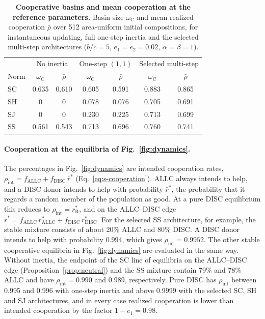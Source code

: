 \documentclass[10pt]{wlscirep}
\newcommand{\rR}{r_{\mathrm{R}}^{*}}
\newcommand{\ALLC}{\mathrm{ALLC}}
\newcommand{\DISC}{\mathrm{DISC}}
\theoremstyle{plain}
\theoremstyle{remark}
\begin{document}
\begin{table}[!htbp]
\centering
\caption{\textbf{Cooperative basins and mean cooperation at the reference parameters.} Basin size $\omega_{\mathrm C}$ and mean realized cooperation $\bar\rho$ over 512 area-uniform initial compositions, for instantaneous updating, full one-step inertia and the selected multi-step architectures ($b/c=5$, $e_1=e_2=0.02$, $\alpha=\beta=1$).}
\label{tab:si-basins}
\small
\begin{tabular}{@{}lcccccc@{}}
\toprule
 & \multicolumn{2}{c}{No inertia} & \multicolumn{2}{c}{One-step $(1,1)$} & \multicolumn{2}{c}{Selected multi-step}\\
Norm & $\omega_{\mathrm C}$ & $\bar\rho$ & $\omega_{\mathrm C}$ & $\bar\rho$ & $\omega_{\mathrm C}$ & $\bar\rho$\\
\midrule
SC & 0.635 & 0.610 & 0.605 & 0.591 & 0.883 & 0.865\\
SH & 0 & 0 & 0.078 & 0.076 & 0.705 & 0.691\\
SJ & 0 & 0 & 0.230 & 0.225 & 0.713 & 0.699\\
SS & 0.561 & 0.543 & 0.713 & 0.696 & 0.760 & 0.741\\
\bottomrule
\end{tabular}
\end{table}

\paragraph{Cooperation at the equilibria of Fig.~\ref{fig:dynamics}.} The percentages in Fig.~\ref{fig:dynamics} are intended cooperation rates, $\rho_{\mathrm{int}}=f_{\ALLC}+f_{\DISC}\,\bar r^*$ (Eq.~\eqref{eq:s-cooperation}). ALLC always intends to help, and a DISC donor intends to help with probability $\bar r^*$, the probability that it regards a random member of the population as good. At a pure DISC equilibrium this reduces to $\rho_{\mathrm{int}}=\rR$, and on the ALLC--DISC edge $\bar r^*=f_{\ALLC}\,r^*_{\ALLC}+f_{\DISC}\,r^*_{\DISC}$. For the selected SS architecture, for example, the stable mixture consists of about 20\% ALLC and 80\% DISC. A DISC donor intends to help with probability 0.994, which gives $\rho_{\mathrm{int}}=0.9952$. The other stable cooperative equilibria in Fig.~\ref{fig:dynamics} are evaluated in the same way. Without inertia, the endpoint of the SC line of equilibria on the ALLC--DISC edge (Proposition~\ref{prop:neutral}) and the SS mixture contain 79\% and 78\% ALLC and have $\rho_{\mathrm{int}}=0.990$ and 0.989, respectively. Pure DISC has $\rho_{\mathrm{int}}$ between 0.995 and 0.996 with one-step inertia and above 0.9999 with the selected SC, SH and SJ architectures, and in every case realized cooperation is lower than intended cooperation by the factor $1-e_1=0.98$.
\end{document}

